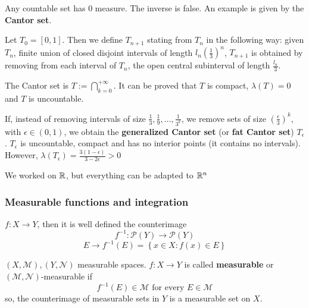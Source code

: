 \begin{remark}
    Any countable set has \(0\) measure. The inverse is false. An example is given by the \textbf{Cantor set}.
    
    Let \(T_0 = [0,1]\). Then we define \(T_{n+1}\) stating from \(T_n\) in the following way:
    given \(T_n\), finite union of closed disjoint intervals of length \(l_n (\frac{1}{3})^n\), \(T_{n+1}\) is obtained by removing from each interval of \(T_n\), the open central subinterval of length \(\frac{l_n}{3}\).

    The Cantor set is \(T := \bigcap_{k=0}^{+\infty}\). It can be proved that \(T\) is compact, \(\lambda(T) = 0\) and \(T\) is uncountable.

    If, instead of removing intervals of size \(\frac{1}{3}, \frac{1}{9}, \ldots, \frac{1}{3^k}\), we remove sets of size \(\left(\frac{\epsilon}{3}\right)^k\), with \(\epsilon \in (0,1)\), we obtain the \textbf{generalized Cantor set} (or \textbf{fat Cantor set}) \(T_{\epsilon}\). \(T_{\epsilon}\) is uncountable, compact and has no interior points (it contains no intervals). However, \(\lambda(T_{\epsilon}) = \frac{3(1 -\epsilon)}{3 - 2\epsilon} > 0\)
\end{remark}
\begin{remark}
    We worked on \(\mathbb{R}\), but everything can be adapted to \(\mathbb{R}^n\)
\end{remark}
\subsubsection*{Measurable functions and integration}
\begin{definition}
    \(f:X \to Y\), then it is well defined the counterimage 
    \[
        f^{-1} : \mathcal{P}(Y) \to \mathcal{P}(Y)
    \]
    \[
        E \to f^{-1}(E) = \left\{ x \in X : f(x) \in E \right\}
    \]
\end{definition}
\begin{definition}
    \((X, \mathcal{M}), (Y, \mathcal{N})\) measurable spaces. \(f:X \to Y\) is called \textbf{measurable} or \((\mathcal{M}, \mathcal{N})\)-measurable if 
    \[
        f^{-1}(E) \in \mathcal{M} \mbox{ for every } E \in \mathcal{M}
    \]
    so, the counterimage of measurable sets in \(Y\) is a measurable set on \(X\).
\end{definition}
